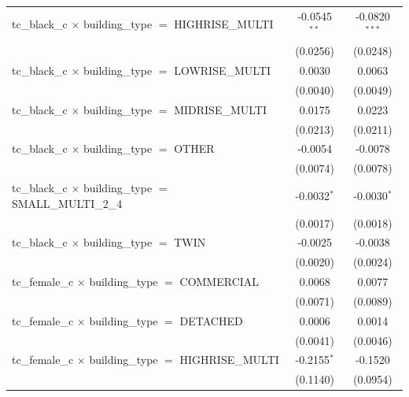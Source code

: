 \begin{tabular}{lcc}
   tc\_black\_c $\times$ building\_type $=$ HIGHRISE\_MULTI            & -0.0545$^{**}$        & -0.0820$^{***}$\\   
                                                                       & (0.0256)              & (0.0248)\\   
   tc\_black\_c $\times$ building\_type $=$ LOWRISE\_MULTI             & 0.0030                & 0.0063\\   
                                                                       & (0.0040)              & (0.0049)\\   
   tc\_black\_c $\times$ building\_type $=$ MIDRISE\_MULTI             & 0.0175                & 0.0223\\   
                                                                       & (0.0213)              & (0.0211)\\   
   tc\_black\_c $\times$ building\_type $=$ OTHER                      & -0.0054               & -0.0078\\   
                                                                       & (0.0074)              & (0.0078)\\   
   tc\_black\_c $\times$ building\_type $=$ SMALL\_MULTI\_2\_4         & -0.0032$^{*}$         & -0.0030$^{*}$\\   
                                                                       & (0.0017)              & (0.0018)\\   
   tc\_black\_c $\times$ building\_type $=$ TWIN                       & -0.0025               & -0.0038\\   
                                                                       & (0.0020)              & (0.0024)\\   
   tc\_female\_c $\times$ building\_type $=$ COMMERCIAL                & 0.0068                & 0.0077\\   
                                                                       & (0.0071)              & (0.0089)\\   
   tc\_female\_c $\times$ building\_type $=$ DETACHED                  & 0.0006                & 0.0014\\   
                                                                       & (0.0041)              & (0.0046)\\   
   tc\_female\_c $\times$ building\_type $=$ HIGHRISE\_MULTI           & -0.2155$^{*}$         & -0.1520\\   
                                                                       & (0.1140)              & (0.0954)\\   

\end{tabular}
